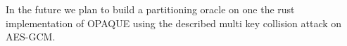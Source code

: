 In the future we plan to build a partitioning oracle on one the rust implementation of OPAQUE\cite{opaque} using the
described multi key collision attack on AES-GCM\@.
